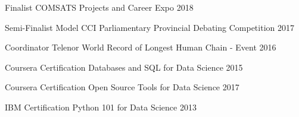 



\begin{cvhonors}

  \cvhonor
    {Finalist} %
    {COMSATS Projects and Career Expo} %
    {} %
    {2018} %

  \cvhonor
    {Semi-Finalist} %
    {Model CCI Parliamentary Provincial Debating Competition} %
    {} %
    {2017} %

  \cvhonor
    {Coordinator} %
    {Telenor World Record of Longest Human Chain - Event} %
    {} %
    {2016} %


\end{cvhonors}




\begin{cvhonors}

  \cvhonor
    {Coursera Certification} %
    {Databases and SQL for Data Science} %
    {} %
    {2015} %

  \cvhonor
    {Coursera Certification} %
    {Open Source Tools for Data Science} %
    {} %
    {2017} %

  \cvhonor
    {IBM Certification} %
    {Python 101 for Data Science} %
    {} %
    {2013} %

\end{cvhonors}
